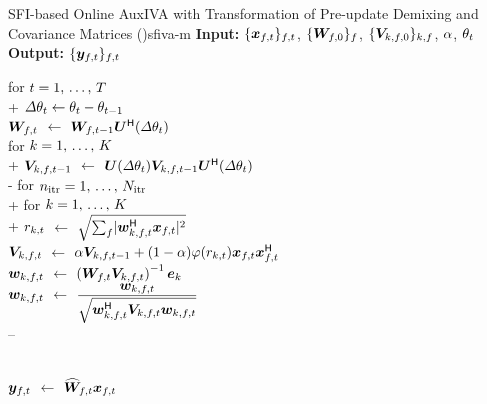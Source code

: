 \documentclass[sip,biber]{now-journal}
\begin{document}
\begin{algorithm}{SFI-based Online AuxIVA with Transformation of Pre-update Demixing and Covariance Matrices (\SFIIVAm)}{sfiva-m}
  \textbf{Input:} $\{\Obs _{\ft}\} _{\ft}$, $ \{\bm{W} _{f,0}\}_{f}$, $\{\bm{V} _{k,f,0}\}_{k,f}$, $\alpha$, $\theta _{t}$ \\
  \textbf{Output:} $\{\Est _{\ft}\} _{\ft}$
  \begin{pseudo}

    for $t = 1,\, \dots,\, T$ \\+
      $\varDelta \theta _{t} \gets \theta _{t} - \theta _{t - 1}$ \\
      {$\bm{W} _{f,t}$} $\gets$ $\bm{W} _{f,t - 1} \bm{U} ^{\mathsf{H}} (\varDelta\theta _{t})$ \ct{$\forall \freq$} \\
      for $k = 1,\, \dots,\, K$ \\+
        {$\cov _{\src,\ft[-1]}$} $\gets$ $\rotMat (\varDelta\rotSpat _{\tframe}) \cov _{\src,\ft[-1]} \rotMat ^{\hermite} (\varDelta \rotSpat _{\tframe})$ \ct{$\forall \freq$} \\-
      for $n _{\mathrm{itr}} = 1,\, \dots,\, N _{\mathrm{itr}}$ \\+
        for $k = 1,\, \dots,\, K$ \\+
          {$r _{k,t}$} $\gets$ $\sqrt{\sum _{\freq} \abs{\demix _{\src,\ft} ^{\hermite} \Obs _{\ft}} ^2}$ \ct{\eqref{eq:var}} \\
          {$\cov _{\src,\ft}    $} $\gets$ $\forget \cov _{\src,\ft[-1]} + (1 - \forget) \weight(\var _{\src,\tframe}) \Obs _{\ft} \Obs _{\ft} ^{\hermite}$ \ct{\eqref{eq:cov}, $\forall \freq$} \\
          {$\demix _{\src,\ft}$} $\gets$ $\left(\Demix _{\ft} \cov _{\src,\ft}\right) ^{-1} \eye _{\src}$ \ct{\eqref{eq:ip:proj}, $\forall \freq$} \\
          {$\demix _{\src,\ft}$} $\gets$ $\dfrac{\demix _{\src,\ft}}{\sqrt{\demix _{\src,\ft} ^{\hermite} \cov _{\src,\ft} \demix _{\src,\ft}}}$ \ct{\eqref{eq:ip:norm}, $\forall \freq$} \\--

       \ct{\eqref{eq:pb:w}, $\forall \freq$}\\
      {$\Est _{\ft}$} $\gets$ $\proj{\Demix }_{\ft} \Obs _{\ft}$ \ct{\eqref{eq:pb:y}, $\forall \freq$}
  \end{pseudo}
\end{algorithm}
\end{document}
